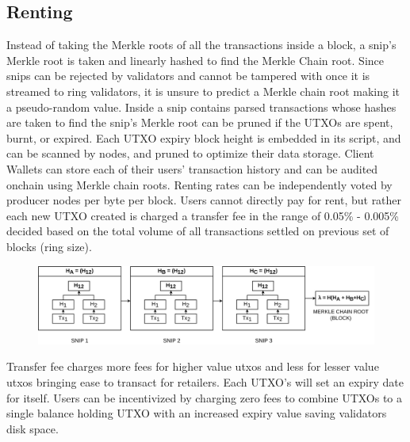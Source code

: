 \documentclass[a4paper,	10pt]{extarticle}
\begin{document}
\subsection{Renting}
Instead of taking the Merkle roots of all the transactions inside a block, a snip's Merkle root is taken and linearly hashed to find the Merkle Chain root. Since snips can be rejected by validators and cannot be tampered with once it is streamed to ring validators, it is unsure to predict a Merkle chain root making it a pseudo-random value. Inside a snip contains parsed transactions whose hashes are taken to find the snip's Merkle root can be pruned if the UTXOs are spent, burnt, or expired. Each UTXO expiry block height is embedded in its script, and can be scanned by nodes, and pruned to optimize their data storage. Client Wallets can store each of their users' transaction history and can be audited onchain using Merkle chain roots. Renting rates can be independently voted by producer nodes per byte per block. Users cannot directly pay for rent, but rather each new UTXO created is charged a transfer fee in the range of 0.05\% - 0.005\% decided based on the total volume of all transactions settled on previous set of blocks (ring size).\\
\begin{figure}[H]
\begin{center}
\includegraphics[width=13cm]{merklechain}
\end{center}
\end{figure}
 Transfer fee charges more fees for higher value utxos and less for lesser value utxos bringing ease to transact for retailers. Each UTXO's will set an expiry date for itself. Users can be incentivized by charging zero fees to combine UTXOs to a single balance holding UTXO with an increased expiry value saving validators disk space. 
\end{document}
